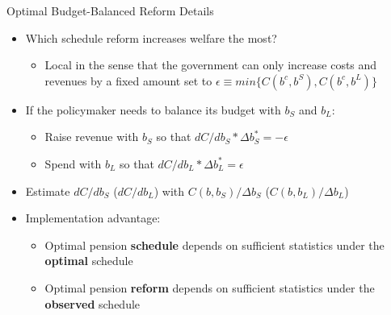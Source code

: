 \begin{frame}[label=optimalDetails]{Optimal Budget-Balanced Reform Details}
    \begin{itemize}
        \item Which schedule reform increases welfare the most?
        \begin{itemize}
            \item Local in the sense that the government can only increase costs and revenues by a fixed amount set to $\epsilon \equiv min\{C(b^c,b^S),C(b^c,b^L)\}$
        \end{itemize}
        \item If the policymaker needs to balance its budget with $b_S$ and $b_L$:
        \begin{itemize}
            \item Raise revenue with $b_S$ so that $dC/db_S * \Delta b_S^* = -\epsilon$
            \item Spend with $b_L$ so that $dC/db_L * \Delta b_L^* = \epsilon$
        \end{itemize}
        \item Estimate $dC/db_S$ ($dC/db_L$) with $C(b,b_S)/\Delta b_S$ ($C(b,b_L)/\Delta b_L$)
        \item Implementation advantage:
        \begin{itemize}
            \item Optimal pension \textbf{schedule} depends on sufficient statistics under the \textbf{optimal} schedule
            \item Optimal pension \textbf{reform} depends on sufficient statistics under the \textbf{observed} schedule
        \end{itemize}
    \end{itemize}
\end{frame}


